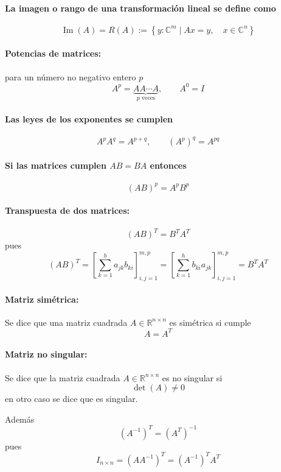 \paragraph{La imagen o rango de una transformación lineal se define como}
\[
  \operatorname{Im}(A)=R(A)
  :=\left\{y:\mathbb{C}^{m}\mid Ax=y,\quad
  x\in\mathbb{C}^{n}\right\}
\]

\paragraph{Potencias de matrices:} para un número no negativo entero $p$
\[
  A^{p}=\underbrace{AA\cdots A}_{p\text{ veces}},
  \qquad A^{0}=I
\]

\paragraph{Las leyes de los exponentes se cumplen}
\[
  A^{p}A^{q}=A^{p+q},
  \qquad
  (A^{p})^{q}=A^{pq}
\]

\paragraph{Si las matrices cumplen $AB=BA$ entonces}
\[
  (AB)^{p}=A^{p}B^{p}
\]

\paragraph{Transpuesta de dos matrices:}
\[
  (AB)^{T}=B^{T}A^{T}
\]
pues
\[
  (AB)^{T}
  =\left[\sum_{k=1}^{h}a_{jk}b_{ki}\right]_{i,j=1}^{m,p}
  =\left[\sum_{k=1}^{h}b_{ki}a_{jk}\right]_{i,j=1}^{m,p}
  =B^{T}A^{T}
\]

\paragraph{Matriz simétrica:}
Se dice que una matriz cuadrada $A\in\mathbb{R}^{n\times n}$ es simétrica si
cumple
\[
  A=A^{T}
\]

\paragraph{Matriz no singular:}
Se dice que la matriz cuadrada $A\in\mathbb{R}^{n\times n}$ es no singular si
\[
  \det(A)\neq 0
\]
en otro caso se dice que es singular.

Además
\[
  (A^{-1})^{T}=(A^{T})^{-1}
\]
pues
\[
  I_{n\times n}=(AA^{-1})^{T}=(A^{-1})^{T}A^{T}
\]